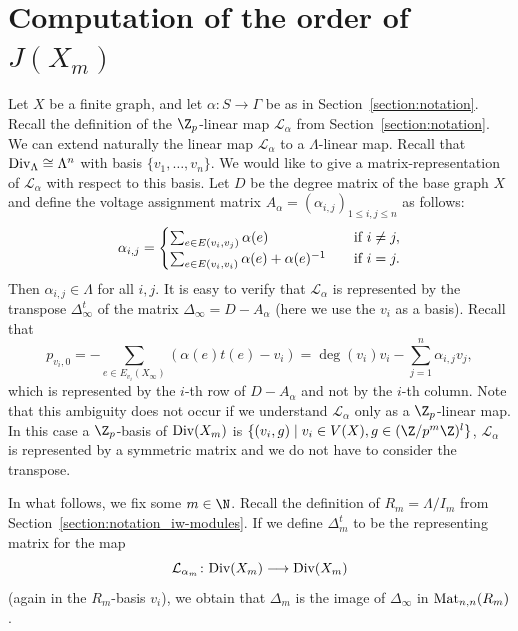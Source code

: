 \section{Computation of the order of \texorpdfstring{$J(X_m)$}{J(Xm)}} \label{section:linearalgebra} 
Let $X$ be a finite graph, and let $\alpha \colon S\longrightarrow \Gamma$ be as in Section~\ref{section:notation}.
Recall the definition of the $\Z_p$-linear map $\mathcal{L}_\alpha$ from Section~\ref{section:notation}. We can extend naturally the linear map $\mathcal{L}_\alpha$ to a $\Lambda$-linear map.
Recall that $\textup{Div}_\Lambda\cong \Lambda^n$ with basis $\{ v_1, \ldots, v_n\}$. We would like to give a matrix-representation of $\mathcal{L}_\alpha$ with respect to this basis. Let $D$ be the degree matrix of the base graph $X$ and define the voltage assignment matrix $A_\alpha=(\alpha_{i,j})_{1\le i,j\le n}$ as follows: 
\[\alpha_{i,j}=\begin{cases}
	\sum _{ e \in E(v_i,v_j)}\alpha(e) \quad & \textup{if } i\neq j,\\
	\sum_{e \in E(v_i,v_i)}\alpha(e)+\alpha(e)^{-1} \quad & \textup{if } i=j.
\end{cases}\] 
Then $\alpha_{i,j} \in \Lambda$ for all $i,j$. It is easy to verify that $\mathcal{L}_\alpha$ is represented by the transpose $\Delta_\infty^t$ of the matrix ${\Delta_\infty=D-A_\alpha}$ (here we use the $v_i$ as a basis). Recall that 
\[p_{v_i,0}=-\sum_{e\in E_{v_i}(X_\infty)}(\alpha(e)t(e)-v_i)=\deg(v_i)v_i-\sum_{j=1}^n \alpha_{i,j}v_j,\]
which is represented by the $i$-th row of $D-A_\alpha$ and not by the $i$-th column. Note that this ambiguity does not occur if we understand $\mathcal{L}_\alpha$ only as a $\Z_p$-linear map. In this case a $\Z_p$-basis of $\textup{Div}(X_m)$ is $\{(v_i,g)\mid v_i\in V(X), g\in (\Z/p^m\Z)^l\}$,  $\mathcal{L}_\alpha$ is represented by a symmetric matrix and we do not have to consider the transpose.

In what follows, we fix some ${m \in \N}$. Recall the definition of ${R_m = \Lambda/I_m}$ from Section~\ref{section:notation_iw-modules}. If we define $\Delta^t_m$ to be the representing matrix for the map 
\[ \mathcal{L}_{\alpha_m} \colon \textup{Div}(X_m) \longrightarrow \textup{Div}(X_m) \]  
(again in the $R_m$-basis  $v_i$), we obtain that $\Delta_m$ is the image of $\Delta_\infty$ in $\textup{Mat}_{n,n}(R_m)$.

